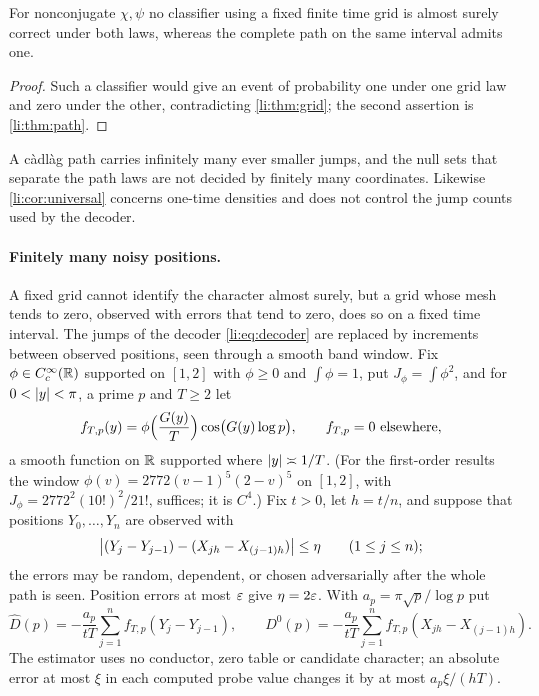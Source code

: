 \begin{corollary}\label{li:cor:grid}
For nonconjugate $\chi,\psi$ no classifier using a fixed finite time grid is almost surely correct under
both laws, whereas the complete path on the same interval admits one.
\end{corollary}

\begin{proof}
Such a classifier would give an event of probability one under one grid law and zero under the
other, contradicting \cref{li:thm:grid}; the second assertion is \cref{li:thm:path}.
\end{proof}

A c\`adl\`ag path carries infinitely many ever smaller jumps, and the null sets that separate the
path laws are not decided by finitely many coordinates. Likewise \cref{li:cor:universal} concerns
one-time densities and does not control the jump counts used by the decoder.

\paragraph{Finitely many noisy positions.} A fixed grid cannot identify the character almost surely,
but a grid whose mesh tends to zero, observed with errors that tend to zero, does so on a fixed time
interval. The jumps of the decoder \eqref{li:eq:decoder} are replaced by increments between observed
positions, seen through a smooth band window. Fix $\phi\in C_c^\infty(\R)$ supported on $[1,2]$ with $\phi\ge0$
and $\int\phi=1$, put $J_\phi=\int\phi^2$, and for $0<\abs y<\pi$, a prime $p$ and $T\ge2$ let
\begin{equation}\label{lih:eq:probe}
 f_{T,p}(y)=\phi\Bigl(\frac{G(y)}T\Bigr)\cos\bigl(G(y)\log p\bigr),\qquad f_{T,p}=0\ \text{elsewhere},
\end{equation}
a smooth function on $\R$ supported where $\abs y\asymp1/T$. (For the first-order results the window
$\phi(v)=2772(v-1)^5(2-v)^5$ on $[1,2]$, with $J_\phi=2772^2(10!)^2/21!$, suffices; it is $C^4$.) Fix $t>0$, let
$h=t/n$, and suppose that positions $Y_0,\dots,Y_n$ are observed with
\begin{equation}\label{lih:eq:noise}
 \abs[\big]{(Y_j-Y_{j-1})-(X_{jh}-X_{(j-1)h})}\le\eta\qquad(1\le j\le n);
\end{equation}
the errors may be random, dependent, or chosen adversarially after the whole path is seen. Position
errors at most $\eps$ give $\eta=2\eps$. With $a_p=\pi\sqrt p/\log p$ put
\[
 \widehat D(p)=-\frac{a_p}{tT}\sum_{j=1}^nf_{T,p}(Y_j-Y_{j-1}),\qquad
 D^0(p)=-\frac{a_p}{tT}\sum_{j=1}^nf_{T,p}(X_{jh}-X_{(j-1)h}).
\]
The estimator uses no conductor, zero table or candidate character; an absolute error at most $\xi$
in each computed probe value changes it by at most $a_p\xi/(hT)$.

